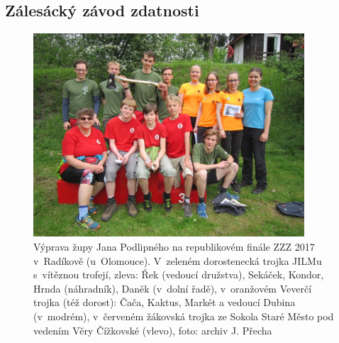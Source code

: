 \documentclass[a5paper, 11pt, twoside]{article}
\begin{document}
\subsection{Zálesácký závod zdatnosti}

\begin{figure}[b!]
  \centering 
  \includegraphics[width=0.9\textwidth]{img/81_zzz.JPG}
  \caption*{Výprava župy Jana Podlipného na republikovém finále ZZZ 2017
  v~Radíkově (u~Olomouce). V~zeleném dorostenecká trojka JILMu s~vítěznou
  trofejí, zleva: Řek (vedoucí družstva), Sekáček, Kondor, Hrnda
  (náhradník), Daněk (v~dolní řadě), v~oranžovém Veverčí trojka (též
  dorost): Čača, Kaktus, Markét a vedoucí Dubina (v~modrém), v~červeném
  žákovská trojka ze Sokola Staré Město pod vedením Věry Čížkovské
  (vlevo), foto: archiv J. Přecha}
\end{figure}
\end{document}
